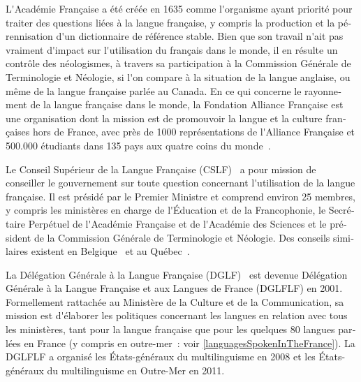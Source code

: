 \documentclass[]{../metanetpaper}
\begin{document}
\begin{french}
\begin{multicols}{2}
L{\mbox '}Académie Française a été créée en 1635 comme l{\mbox '}organisme ayant
priorité pour traiter des questions liées à la langue française, y
compris la production et la pérennisation d{\mbox '}un dictionnaire de référence stable. Bien que son
travail n{\mbox '}ait pas vraiment d{\mbox '}impact sur l{\mbox '}utilisation du français dans
le monde, il en résulte un contrôle des néologismes, à travers sa
participation à la Commission Générale de Terminologie et Néologie, si
l{\mbox '}on compare à la situation de la langue anglaise, ou même de la
langue française parlée au Canada. En ce qui concerne le rayonnement de la langue française dans le monde,
la Fondation Alliance Française est une organisation dont la mission est de promouvoir la langue et la
culture françaises hors de France, avec près de 1000 représentations
de l{\mbox '}Alliance Française et 500.000 étudiants dans 135 pays aux quatre coins du monde~\cite{monde}.

Le Conseil Supérieur de la Langue Française (CSLF)~\cite{cslf} a pour mission de
conseiller le gouvernement sur toute question concernant l{\mbox '}utilisation
de la langue française. Il est présidé par le Premier Ministre et
comprend environ 25 membres, y compris les ministères en charge de
l{\mbox '}Éducation et de la Francophonie, le Secrétaire Perpétuel de
l{\mbox '}Académie Française et de l{\mbox '}Académie des Sciences et le président de
la Commission Générale de Terminologie et Néologie. Des conseils
similaires existent en Belgique~\cite{belgique} et au Québec~\cite{quebec}.

La Délégation Générale à la Langue Française (DGLF)~\cite{dglf} est
devenue Délégation Générale à la Langue Française et aux Langues de
France (DGLFLF) en 2001. Formellement rattachée au Ministère de la
Culture et de la Communication, sa mission est d{\mbox '}élaborer les
politiques concernant les langues en relation avec tous les
ministères, tant pour la langue française que pour les quelques 80
langues parlées en France (y compris en outre-mer~: voir
\ref{languagesSpokenInTheFrance}). La DGLFLF a organisé les
États-généraux du multilinguisme en 2008 et les États-généraux du
multilinguisme en Outre-Mer en 2011.


\end{multicols}
\end{french}
\end{document}
